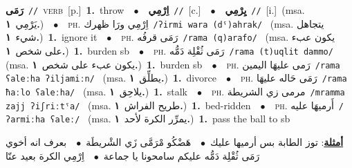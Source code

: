 \documentclass[10pt,a4paper,twoside]{article} %
\begin{document}
\begin{multicols}{2}
{\setlength\topsep{0pt}\textbf{\foreignlanguage{arabic}{رَمَى}}\ {\color{gray}\texttt{//}\color{black}}\ \textsc{verb}\ [p.]\ \textbf{1.}~throw\ \ $\bullet$\ \ \setlength\topsep{0pt}\textbf{\foreignlanguage{arabic}{اِرْمِي}}\ {\color{gray}\texttt{//}\color{black}}\ [c.]\ \ $\bullet$\ \ \setlength\topsep{0pt}\textbf{\foreignlanguage{arabic}{يِرْمِي}}\ {\color{gray}\texttt{//}\color{black}}\ [i.]\ \color{gray}(msa. \foreignlanguage{arabic}{يَرْمِي}~\foreignlanguage{arabic}{\textbf{١.}})\color{black}\ \ $\bullet$\ \ \textsc{ph.} \color{gray} \foreignlanguage{arabic}{اِرْمِي ورَا ظهرك}\color{black}\ {\color{gray}\texttt{/{\sffamily ʔirmi wara (dˤ)ahrak}/}\color{black}}\ \color{gray} (msa. \foreignlanguage{arabic}{يتجاهل شيء}~\foreignlanguage{arabic}{\textbf{١.}})\color{black}\ \textbf{1.}~ignore it\ \ $\bullet$\ \ \textsc{ph.} \color{gray} \foreignlanguage{arabic}{رَمَى قرفُه}\color{black}\ {\color{gray}\texttt{/{\sffamily rama (q)arafo}/}\color{black}}\ \color{gray} (msa. \foreignlanguage{arabic}{يكون عبء على شخص}~\foreignlanguage{arabic}{\textbf{١.}})\color{black}\ \textbf{1.}~burden sb\ \ $\bullet$\ \ \textsc{ph.} \color{gray} \foreignlanguage{arabic}{رَمَى ثُقْلِة دَمُّه}\color{black}\ {\color{gray}\texttt{/{\sffamily rama (t)uqlit dammo}/}\color{black}}\ \color{gray} (msa. \foreignlanguage{arabic}{يكون عبء على شخص}~\foreignlanguage{arabic}{\textbf{١.}})\color{black}\ \textbf{1.}~burden sb\ \ $\bullet$\ \ \textsc{ph.} \color{gray} \foreignlanguage{arabic}{رَمى عليهَا اليمين}\color{black}\ {\color{gray}\texttt{/{\sffamily rama ʕaleːha ʔiljamiːn}/}\color{black}}\ \color{gray} (msa. \foreignlanguage{arabic}{يطلِّق}~\foreignlanguage{arabic}{\textbf{١.}})\color{black}\ \textbf{1.}~divorce\ \ $\bullet$\ \ \textsc{ph.} \color{gray} \foreignlanguage{arabic}{رَمَى حَاله عليهَا}\color{black}\ {\color{gray}\texttt{/{\sffamily rama ħaːlo ʕaleːha}/}\color{black}}\ \color{gray} (msa. \foreignlanguage{arabic}{يلاحِق}~\foreignlanguage{arabic}{\textbf{١.}})\color{black}\ \textbf{1.}~stalk\ \ $\bullet$\ \ \textsc{ph.} \color{gray} \foreignlanguage{arabic}{مرمى زي الشريطة}\color{black}\ {\color{gray}\texttt{/{\sffamily mramma zajj ʔiʃriːtˤa}/}\color{black}}\ \color{gray} (msa. \foreignlanguage{arabic}{طريح الفراش}~\foreignlanguage{arabic}{\textbf{١.}})\color{black}\ \textbf{1.}~bed-ridden\ \ $\bullet$\ \ \textsc{ph.} \color{gray} \foreignlanguage{arabic}{أَرميهَا عليه}\color{black}\ {\color{gray}\texttt{/{\sffamily ʔarmiːha ʕaleː}/}\color{black}}\ \color{gray} (msa. \foreignlanguage{arabic}{يمرِّر الكرة لأحد}~\foreignlanguage{arabic}{\textbf{١.}})\color{black}\ \textbf{1.}~pass the ball to sb\  \begin{flushright}\color{gray}\foreignlanguage{arabic}{\textbf{\underline{\foreignlanguage{arabic}{أمثلة}}}: توز الطابة بس أرميها عليك\ $\bullet$\ \  هَضْكُو مْرَمَّى زَي الشْريطَة\ $\bullet$\ \  بعرف انه أخوي رَمَى ثُقْلِة دَمُّه عليكم سامحونا يا جماعة\ $\bullet$\ \  اِرْمِي الكرة بعيد عنّا}\end{flushright}\color{black}} \vspace{2mm}


\end{multicols}
\end{document}
